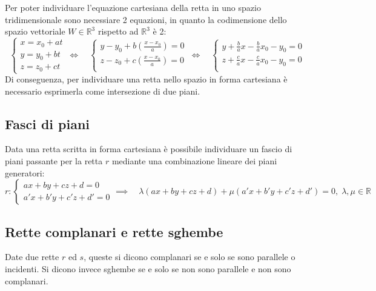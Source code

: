 \documentclass{article}
\begin{document}
    Per poter individuare l'equazione cartesiana della retta in uno spazio tridimensionale sono necessiare 2 equazioni,
    in quanto la codimensione dello spazio vettoriale $W \in \mathbb{R}^3$ rispetto ad $\mathbb{R}^3$ è 2:
    \[
        \begin{cases}
            x = x_0 + a t \\
            y = y_0 + b t \\
            z = z_0 + c t 
        \end{cases}
        \, 
        \iff
        \quad
        \begin{cases}
            y - y_0 + b(\frac{x - x_0}{a}) = 0 \\
            z - z_0 + c(\frac{x - x_0}{a}) = 0 \\
        \end{cases}
        \, 
        \iff
        \quad
        \begin{cases}
            y + \frac{b}{a}x - \frac{b}{a}x_0 - y_0 = 0\\
            z + \frac{c}{a}x - \frac{c}{a}x_0 - y_0 = 0\\
        \end{cases}
    \]
    Di conseguenza, per individuare una retta nello spazio in forma cartesiana è necessario esprimerla come intersezione di due piani.



\subsection{Fasci di piani}
    Data una retta scritta in forma cartesiana è possibile individuare un fascio di piani passante per la retta $r$ mediante 
    una combinazione lineare dei piani generatori:
    \[
        r: \begin{cases} ax + by + cz + d = 0 \\ a'x + b'y + c'z + d' = 0\end{cases} \implies \quad \lambda(ax + by + cz + d) + \mu(a'x + b'y + c'z + d') = 0, \; \lambda, \mu \in \mathbb{R}
    \]



\subsection{Rette complanari e rette sghembe}
    Date due rette $r$ ed $s$, queste si dicono complanari se e solo se sono parallele o incidenti. Si dicono invece sghembe se e solo se non sono parallele e non sono complanari. 
\end{document}
